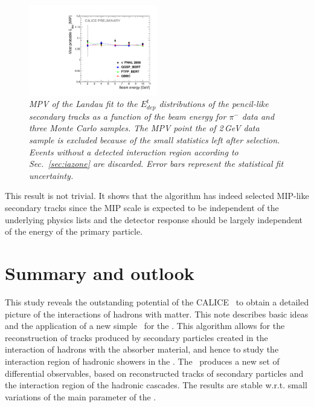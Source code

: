 \begin{figure}
	\centering
	\includegraphics[width=0.5\textwidth]{ECAL/plots/calibrationfit-graph.pdf}
	\caption{\label{fig:calibrationgraph} \sl MPV of the Landau fit to the $E_{dep}^t$ distributions of the pencil-like secondary tracks as a function of the beam energy for $\pi^-$ data and three Monte Carlo samples. The MPV point the of 2\,GeV data sample is excluded because of the small statistics left after selection. Events without a detected interaction region  according to Sec.~\ref{sec:iazone} are discarded.  Error bars represent the statistical fit uncertainty.}
\end{figure}

This result is not trivial. It shows that the algorithm has indeed selected MIP-like secondary tracks since the MIP scale is expected to be independent of the underlying physics lists and the detector response should be largely independent of the energy of the primary particle. 

\section{Summary and outlook}

This study reveals the outstanding potential of the CALICE \ecalp\ to obtain a detailed picture of the interactions of hadrons with matter. 
This note describes basic ideas and the application of a new simple \tfa\ for the \ecal. This algorithm allows for the reconstruction of tracks produced by secondary particles created in the interaction of hadrons with the absorber material, and hence to study the interaction region of hadronic showers in the \ecal. The \tfa\ produces a new set of differential observables, based on reconstructed tracks of secondary particles and the interaction region of the hadronic cascades. The results are stable w.r.t. small variations of the main parameter of the \tfa.

